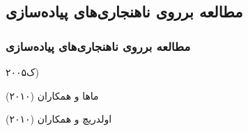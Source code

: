 \label{studies_on_code_anomalies}

\subsection{مطالعه برروی ناهنجاری‌های پیاده‌سازی}
\begin{frame}
\frametitle{مطالعه برروی ناهنجاری‌های پیاده‌سازی}

\begin{block}{ک۲۰۰۵)}
\end{block}

\begin{block}{ماها و همکاران (۲۰۱۰)}
\end{block}

\begin{block}{اولدریچ و همکاران (۲۰۱۰)}
\end{block}

\end{frame}
